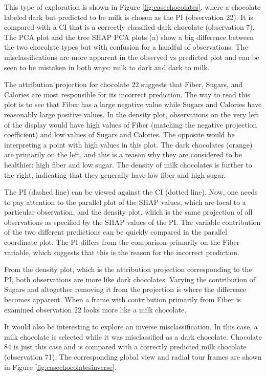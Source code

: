 \documentclass[
]{jss}
\begin{document}
This type of exploration is shown in Figure \ref{fig:casechocolates},
where a chocolate labeled dark but predicted to be milk is chosen as the
PI (observation 22). It is compared with a CI that is a correctly
classified dark chocolate (observation 7). The PCA plot and the tree
SHAP PCA plots (a) show a big difference between the two chocolate types
but with confusion for a handful of observations. The misclassifications
are more apparent in the observed vs predicted plot and can be seen to
be mistaken in both ways: milk to dark and dark to milk.

The attribution projection for chocolate 22 suggests that Fiber, Sugars,
and Calories are most responsible for its incorrect prediction. The way
to read this plot is to see that Fiber has a large negative value while
Sugars and Calories have reasonably large positive values. In the
density plot, observations on the very left of the display would have
high values of Fiber (matching the negative projection coefficient) and
low values of Sugars and Calories. The opposite would be interpreting a
point with high values in this plot. The dark chocolates (orange) are
primarily on the left, and this is a reason why they are considered to
be healthier: high fiber and low sugar. The density of milk chocolates
is further to the right, indicating that they generally have low fiber
and high sugar.

The PI (dashed line) can be viewed against the CI (dotted line). Now,
one needs to pay attention to the parallel plot of the SHAP values,
which are local to a particular observation, and the density plot, which
is the same projection of all observations as specified by the SHAP
values of the PI. The variable contribution of the two different
predictions can be quickly compared in the parallel coordinate plot. The
PI differs from the comparison primarily on the Fiber variable, which
suggests that this is the reason for the incorrect prediction.

From the density plot, which is the attribution projection corresponding
to the PI, both observations are more like dark chocolates. Varying the
contribution of Sugars and altogether removing it from the projection is
where the difference becomes apparent. When a frame with contribution
primarily from Fiber is examined observation 22 looks more like a milk
chocolate.

It would also be interesting to explore an inverse misclassification. In
this case, a milk chocolate is selected while it was misclassified as a
dark chocolate. Chocolate 84 is just this case and is compared with a
correctly predicted milk chocolate (observation 71). The corresponding
global view and radial tour frames are shown in Figure
\ref{fig:casechocolatesinverse}.
\end{document}
